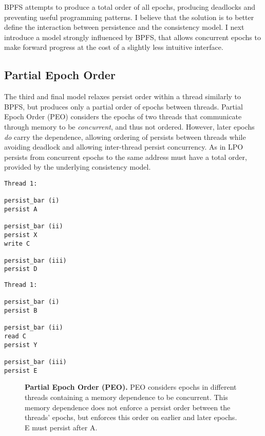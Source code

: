 BPFS attempts to produce a total order of all epochs, producing deadlocks and preventing useful programming patterns.
I believe that the solution is to better define the interaction between persistence and the consistency model.
I next introduce a model strongly influenced by BPFS, that allows concurrent epochs to make forward progress at the cost of a slightly less intuitive interface.

\subsection{Partial Epoch Order}
\label{sec:PMC:PersistenceModels:PEO}

The third and final model relaxes persist order within a thread similarly to BPFS, but produces only a partial order of epochs between threads.
Partial Epoch Order (PEO) considers the epochs of two threads that communicate through memory to be \emph{concurrent}, and thus not ordered.
However, later epochs \emph{do} carry the dependence, allowing ordering of persists between threads while avoiding deadlock and allowing inter-thread persist concurrency.
As in LPO persists from concurrent epochs to the same address must have a total order, provided by the underlying consistency model.

{
\singlespacing
\newsavebox{\PEOThreadOne}
\begin{lrbox}{\PEOThreadOne}
  \begin{lstlisting}
Thread 1:

persist_bar (i)
persist A

persist_bar (ii)
persist X
write C

persist_bar (iii)
persist D
  \end{lstlisting}
\end{lrbox}

\newsavebox{\PEOThreadTwo}
\begin{lrbox}{\PEOThreadTwo}
  \begin{lstlisting}
Thread 1:

persist_bar (i)
persist B

persist_bar (ii)
read C
persist Y

persist_bar (iii)
persist E
  \end{lstlisting}
\end{lrbox}

\begin{figure}[]
\centering
\subfigure{ \usebox{\PEOThreadOne} }
\hspace{1 in}
\subfigure{ \usebox{\PEOThreadTwo} }
\caption{\textbf{Partial Epoch Order (PEO).} PEO considers epochs in different threads containing a memory dependence to be concurrent.  This memory dependence does not enforce a persist order between the threads' epochs, but enforces this order on earlier and later epochs.  E must persist after A.}
\label{fig:PEO}
\end{figure}
}

